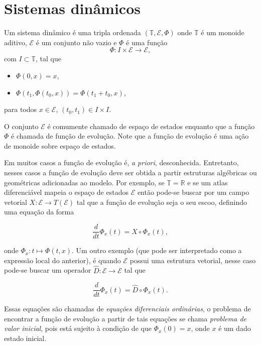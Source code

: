 \chapter{Sistemas dinâmicos}
\label{cap:dinamicos}

\begin{definicao}
   Um sistema dinâmico é uma tripla ordenada
   $(\mathbb{T}, \mathcal{E}, \Phi)$
   onde $\mathbb{T}$ é um monoide aditivo,
   $\mathcal{E}$ é um conjunto não vazio e
   $\Phi$ é uma função
   $$
      \Phi: I \times \mathcal{E} \rightarrow \mathcal{E},
   $$
   com $I \subset \mathbb{T}$, tal que
   \begin{itemize}
      \item $\Phi(0, x) = x$,
      \item $\Phi(t_1, \Phi(t_0, x)) = \Phi(t_1 + t_0, x)$,
   \end{itemize}
   para todos $x\in\mathcal{E}$, $(t_0, t_1)\in I \times I$.
\end{definicao}

O conjunto $\mathcal{E}$ é comumente chamado de espaço de estados
enquanto que a função $\Phi$ é chamada de função de evolução.
Note que a função de evolução é uma ação de monoide sobre espaço de estados.

Em muitos casos a função de evolução é, \textit{a priori},
desconhecida.
Entretanto, nesses casos a função de evolução deve ser obtida a partir
estruturas algébricas ou geométricas adicionadas ao modelo.
Por exemplo, se $\mathbb{T} = \mathbb{R}$ e se
um atlas diferenciável mapeia o espaço de estados $\mathcal{E}$
então pode-se buscar por um campo vetorial
$X:\mathcal{E} \rightarrow T(\mathcal{E})$
tal que a função de evolução seja o seu escoo, definindo uma
equação da forma

\begin{equation}
   \frac{d}{dt} \Phi_x(t) = X \circ \Phi_x(t),
\end{equation}

\noindent
onde $\Phi_x: t \mapsto \Phi(t, x)$.
Um outro exemplo (que pode ser interpretado como a expressão local do anterior),
é quando $\mathcal{E}$ possui uma estrutura vetorial,
nesse caso pode-se buscar um operador
$\hat{D}: \mathcal{E} \rightarrow \mathcal{E}$
tal que

\begin{equation}
   \frac{d}{dt} \Phi_x(t) = \hat{D} \circ \Phi_x(t).
\end{equation}

\noindent
Essas equações são chamadas de \textit{equações diferenciais ordinárias},
o problema de encontrar a função de evolução a partir de tais equações
se chama \textit{problema de valor inicial},
pois está sujeito à condição de que $\Phi_x(0) = x$,
onde $x$ é um dado estado inicial.
